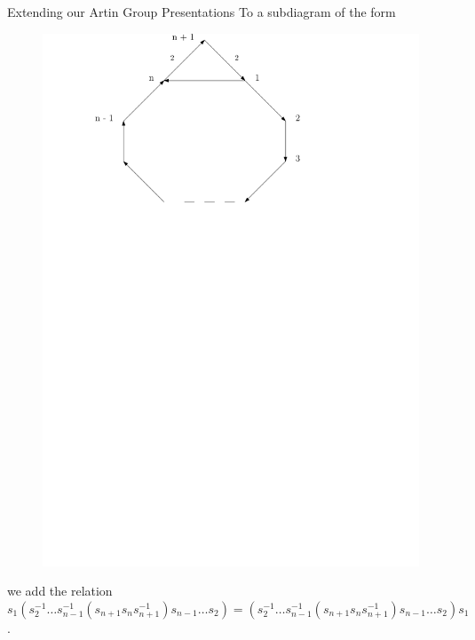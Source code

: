 \documentclass{beamer}
\begin{document}
\begin{frame}{Extending our Artin Group Presentations}
To a subdiagram of the form
\begin{figure}
\includegraphics[scale = .50]{Diagram4.pdf}
\end{figure}
we add the relation $s_{1}(s_{2}^{-1} \dots s_{n-1}^{-1}(s_{n+1}s_{n}s_{n+1}^{-1})s_{n-1} \dots s_{2}) = (s_{2}^{-1} \dots s_{n-1}^{-1}(s_{n+1}s_{n}s_{n+1}^{-1})s_{n-1} \dots s_{2})s_{1}$.
\end{frame}
\end{document}
